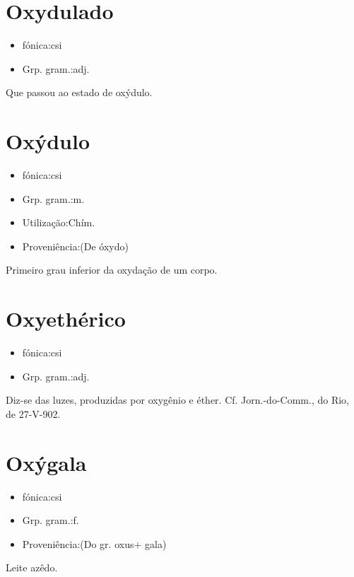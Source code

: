 \section{Oxydulado}
\begin{itemize}
\item {fónica:csi}
\end{itemize}
\begin{itemize}
\item {Grp. gram.:adj.}
\end{itemize}
Que passou ao estado de oxýdulo.
\section{Oxýdulo}
\begin{itemize}
\item {fónica:csi}
\end{itemize}
\begin{itemize}
\item {Grp. gram.:m.}
\end{itemize}
\begin{itemize}
\item {Utilização:Chím.}
\end{itemize}
\begin{itemize}
\item {Proveniência:(De \textunderscore óxydo\textunderscore )}
\end{itemize}
Primeiro grau inferior da oxydação de um corpo.
\section{Oxyethérico}
\begin{itemize}
\item {fónica:csi}
\end{itemize}
\begin{itemize}
\item {Grp. gram.:adj.}
\end{itemize}
Diz-se das luzes, produzidas por oxygênio e éther. Cf. \textunderscore Jorn.-do-Comm.\textunderscore , do Rio, de 27-V-902.
\section{Oxýgala}
\begin{itemize}
\item {fónica:csi}
\end{itemize}
\begin{itemize}
\item {Grp. gram.:f.}
\end{itemize}
\begin{itemize}
\item {Proveniência:(Do gr. \textunderscore oxus\textunderscore  + \textunderscore gala\textunderscore )}
\end{itemize}
Leite azêdo.
